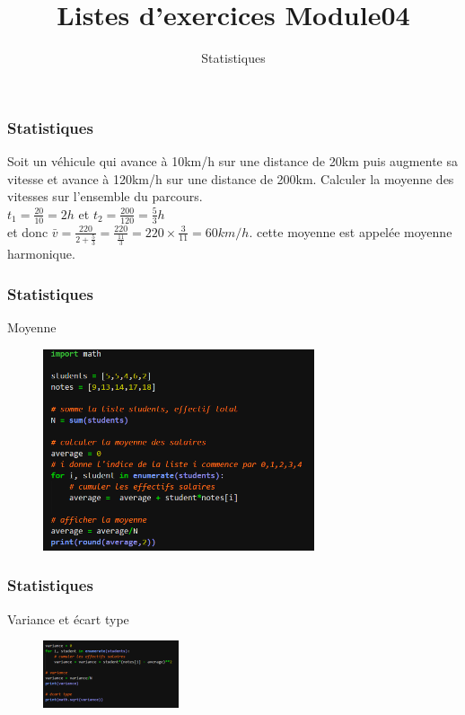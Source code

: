 \documentclass{beamer}
\begin{document}
  
  \title{Listes d'exercices Module04  }
  \subtitle{Statistiques}
  \maketitle

  \begin{frame} %
  \frametitle{Statistiques}
  \begin{exercice}[1]
   Soit un véhicule qui avance à 10km/h sur une distance de 20km puis augmente sa vitesse et avance à 120km/h sur une distance de 200km. Calculer la moyenne des vitesses sur l'ensemble du parcours. \\
   $t_1 = \frac{20}{10} = 2h$ et $t_2=\frac{200}{120} = \frac{5}{3} h$ 
   \\ et donc $\bar{v} = \frac{220}{2 + \frac{5}{3}} = \frac{220}{\frac{11}{3}} = 220 \times \frac{3}{11} = 60 km/h$. cette moyenne est appelée moyenne harmonique.
  \end{exercice}

\end{frame}

\begin{frame} %
  \frametitle{Statistiques}
  \begin{exercice}[2.1]
    Moyenne
    \begin{figure}[!h]
      \includegraphics[width=8cm]{../Images/stat_exo21_corr}
  \end{figure} 
  \end{exercice}

\end{frame}

\begin{frame} %
  \frametitle{Statistiques}
  \begin{exercice}[2.1]
    Variance et écart type
    \begin{figure}[!h]
      \includegraphics[width=4cm]{../Images/stat_exo22_corr}
  \end{figure} 
  \end{exercice}

\end{frame}
\end{document}
